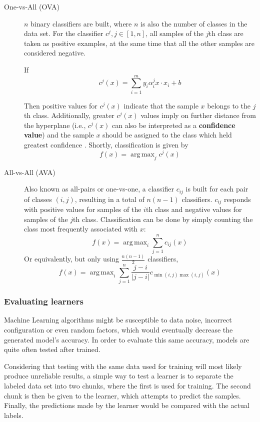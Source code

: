 \documentclass[12pt]{article}
\DeclareMathOperator*{\argmax}{arg\,max}
\begin{document}
\begin{description}
	\item[One-vs-All (OVA)] $n$ binary classifiers are built, where $n$ is also the number of classes in the data set. For the classifier $c^j, j \in [1, n]$, all samples of the $j$th class are taken as positive examples, at the same time that all the other samples are considered negative.

	If
	$$c^j(x) = \sum_{i=1}^{m} y_i \alpha_i^j x \cdot x_i + b$$

	Then positive values for $c^j(x)$ indicate that the sample $x$ belongs to the $j$th class. Additionally, greater $c^j(x)$ values imply on further distance from the hyperplane (i.e., $c^j(x)$ can also be interpreted as a \textbf{confidence value}) and the sample $x$ should be assigned to the class which held greatest confidence \cite{ovacj}. Shortly, classification is given by
	$$ f(x) = \argmax_j{c^j(x)} $$
	\item[All-vs-All (AVA)] Also known as all-pairs or one-vs-one, a classifier $c_{ij}$ is built for each pair of classes $(i, j)$, resulting in a total of $n(n-1)$ classifiers. $c_{ij}$ responds with positive values for samples of the $i$th class and negative values for samples of the $j$th class. Classification can be done by simply counting the class most frequently associated with $x$:
	$$ f(x) = \argmax_i{\sum_{j=1}^{n} c_{ij}(x)} $$
	Or equivalently, but only using $\frac{n(n-1)}{2}$ classifiers,
	$$ f(x) = \argmax_i{\sum_{j=1}^{n} \frac{j-i}{|j-i|} c_{\min(i, j) \max(i, j)}(x)} $$
\end{description}

\subsubsection{Evaluating learners}

Machine Learning algorithms might be susceptible to data noise, incorrect configuration or even random factors, which would eventually decrease the generated model's accuracy. In order to evaluate this same accuracy, models are quite often tested after trained.

Considering that testing with the same data used for training will most likely produce unreliable results, a simple way to test a learner is to separate the labeled data set into two chunks, where the first is used for training. The second chunk is then be given to the learner, which attempts to predict the samples. Finally, the predictions made by the learner would be compared with the actual labels.
\end{document}
